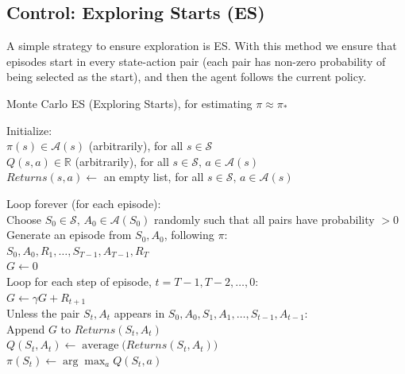 \subsection{Control: Exploring Starts (ES)}
A simple strategy to ensure exploration is ES. With this method we ensure that episodes start in every state-action pair (each pair has non-zero probability of being selected as the start), and then the agent follows the current policy. 
\begin{algobox}{Monte Carlo ES (Exploring Starts), for estimating $\pi \approx \pi_*$}
\raggedright
Initialize:\\
\hspace*{1.5em}$\pi(s) \in \mathcal{A}(s)$ (arbitrarily), for all $s \in \mathcal{S}$\\
\hspace*{1.5em}$Q(s,a) \in \mathbb{R}$ (arbitrarily), for all $s \in \mathcal{S},\, a \in \mathcal{A}(s)$\\
\hspace*{1.5em}$\mathit{Returns}(s,a) \leftarrow$ an empty list, for all $s \in \mathcal{S},\, a \in \mathcal{A}(s)$

\medskip
Loop forever (for each episode):\\
\hspace*{1.5em}Choose $S_0 \in \mathcal{S},\, A_0 \in \mathcal{A}(S_0)$ randomly such that all pairs have probability $> 0$\\
\hspace*{1.5em}Generate an episode from $S_0, A_0$, following $\pi$:\\
\hspace*{3em}$S_0, A_0, R_1, \dots, S_{T-1}, A_{T-1}, R_T$\\
\hspace*{1.5em}$G \leftarrow 0$\\
\hspace*{1.5em}Loop for each step of episode, $t = T-1, T-2, \dots, 0$:\\
\hspace*{3em}$G \leftarrow \gamma G + R_{t+1}$\\
\hspace*{3em}Unless the pair $S_t, A_t$ appears in $S_0, A_0, S_1, A_1, \dots, S_{t-1}, A_{t-1}$:\\
\hspace*{4.5em}Append $G$ to $\mathit{Returns}(S_t,A_t)$\\
\hspace*{4.5em}$Q(S_t,A_t) \leftarrow \operatorname{average}\bigl(\mathit{Returns}(S_t,A_t)\bigr)$\\
\hspace*{4.5em}$\pi(S_t) \leftarrow \arg\max_a Q(S_t,a)$
\end{algobox}


